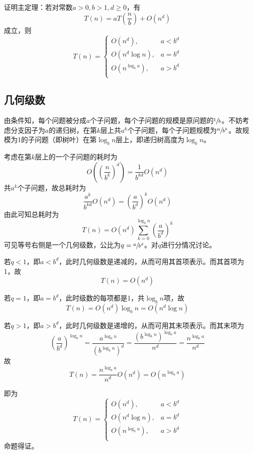 

证明主定理：若对常数$a > 0, b > 1, d \ge0$，有
\[ T(n) = aT\left(\frac nb\right) + O\left(n^d\right) \]
成立，则
\[ T(n) = \begin{cases}
  O\left(n^d\right), & a < b^d \\
  O\left(n^d\log n\right), & a = b^d \\
  O\left(n^{\log_ba}\right), & a > b^d \\
\end{cases} \]

\subsection{几何级数}

由条件知，每个问题被分成$a$个子问题，每个子问题的规模是原问题的$\sfrac1b$。不妨考虑分支因子为$a$的递归树，在第$k$层上共$a^k$个子问题，每个子问题规模为$\sfrac n{b^k}$。故规模为1的子问题（即树叶）在第$\log_bn$层上，即递归树高度为$\log_bn$。

考虑在第$k$层上的一个子问题的耗时为
\[ O\left(\left(\frac n{b^k}\right)^d\right) = \frac1{b^{kd}}O\left(n^d\right) \]
共$a^k$个子问题，故总耗时为
\[ \frac{a^k}{b^{kd}}O\left(n^d\right) = \left(\frac a{b^d}\right)^kO\left(n^d\right) \]
由此可知总耗时为
\[ T(n) = O\left(n^d\right)\sum_{k = 0}^{\log_bn}\left(\frac a{b^d}\right)^k \]
可见等号右侧是一个几何级数，公比为$q = \sfrac a{b^d}$。对$q$进行分情况讨论。

若$q < 1$，即$a < b^d$，此时几何级数是递减的，从而可用其首项表示。而其首项为1，故
\[ T(n) = O\left(n^d\right) \]

若$q = 1$，即$a = b^d$，此时级数的每项都是1，共$\log_bn$项，故
\[ T(n) = O\left(n^d\right)\log_bn = O\left(n^d\log n\right) \]

若$q > 1$，即$a > b^d$，此时几何级数是递增的，从而可用其末项表示。而其末项为
\[ \left(\frac a{b^d}\right)^{\log_bn} = \frac{a^{\log_bn}}{\left(b^{\log_bn}\right)^d} = \frac{\left(b^{\log_bn}\right)^{\log_ba}}{n^d} = \frac{n^{\log_ba}}{n^d} \]
故
\[ T(n) = \frac{n^{\log_ba}}{n^d}O\left(n^d\right) = O\left(n^{\log_ba}\right) \]

即为
\[ T(n) = \begin{cases}
  O\left(n^d\right), & a < b^d \\
  O\left(n^d\log n\right), & a = b^d \\
  O\left(n^{\log_ba}\right), & a > b^d \\
\end{cases} \]
命题得证。
